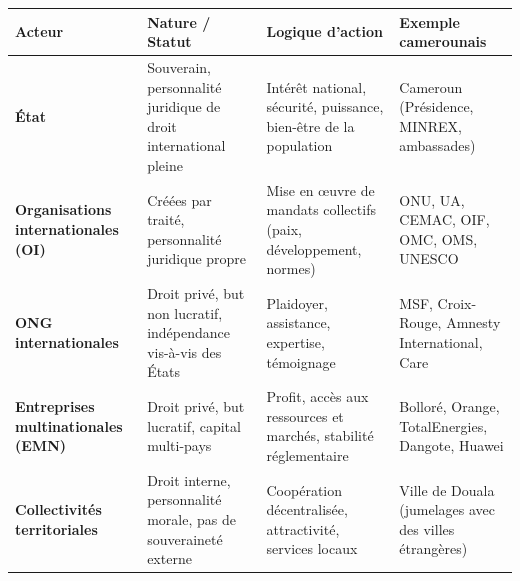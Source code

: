\documentclass[11pt]{article}
\begin{document}
\begin{center}
\begin{tabularx}{\linewidth}{|l|X|X|X|}
\hline
\rowcolor{popblueL}
\textbf{Acteur} & \textbf{Nature / Statut} & \textbf{Logique d'action} & \textbf{Exemple camerounais} \\
\hline
\textbf{État} & Souverain, personnalité juridique de droit international pleine & Intérêt national, sécurité, puissance, bien-être de la population & Cameroun (Présidence, MINREX, ambassades) \\
\hline
\textbf{Organisations internationales (OI)} & Créées par traité, personnalité juridique propre & Mise en œuvre de mandats collectifs (paix, développement, normes) & ONU, UA, CEMAC, OIF, OMC, OMS, UNESCO \\
\hline
\textbf{ONG internationales} & Droit privé, but non lucratif, indépendance vis-à-vis des États & Plaidoyer, assistance, expertise, témoignage & MSF, Croix-Rouge, Amnesty International, Care \\
\hline
\textbf{Entreprises multinationales (EMN)} & Droit privé, but lucratif, capital multi-pays & Profit, accès aux ressources et marchés, stabilité réglementaire & Bolloré, Orange, TotalEnergies, Dangote, Huawei \\
\hline
\textbf{Collectivités territoriales} & Droit interne, personnalité morale, pas de souveraineté externe & Coopération décentralisée, attractivité, services locaux & Ville de Douala (jumelages avec des villes étrangères) \\
\hline
\end{tabularx}
\end{center}
\end{document}

